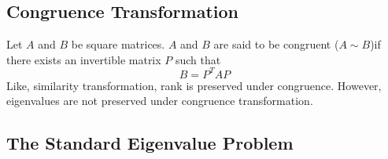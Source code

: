 \documentclass[12pt,gsu,online,openany,singleside,hidelinks]{gsudiss}
\newcommand{\comm}[1]{\added[comment={#1}]{}}
\newcommand{\del}[1]{\deleted[comment={remove}]{#1}}
\begin{document}
\subsection{Congruence Transformation}
Let $A$ and $B$ be square matrices. $A$ and $B$ are said to be congruent ($A \sim B$\del{ })\added{ }if there exists an invertible matrix $P$ such that
\begin{equation}
	B = P^TAP
\end{equation}
Like, similarity transformation, rank is preserved under congruence. However, eigenvalues are not preserved under congruence transformation.\comm{This is much less important to note than the fact that congruence of both $A$ and $B$ for a matrix pencil does preserve generalized eigenvalues.  I'd get rid of this as a separate section and merge it with the section on the generalized eigenvalue problem.}

\subsection{The Standard Eigenvalue Problem}
\end{document}
